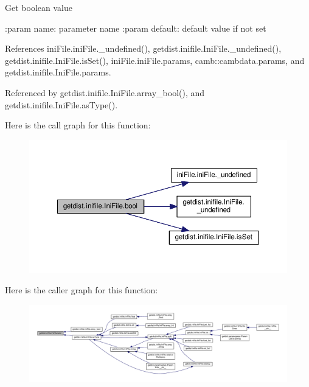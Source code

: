 \begin{DoxyVerb}Get boolean value

:param name: parameter name
:param default: default value if not set
\end{DoxyVerb}
 

References ini\+File.\+ini\+File.\+\_\+undefined(), getdist.\+inifile.\+Ini\+File.\+\_\+undefined(), getdist.\+inifile.\+Ini\+File.\+is\+Set(), ini\+File.\+ini\+File.\+params, camb\+::cambdata.\+params, and getdist.\+inifile.\+Ini\+File.\+params.



Referenced by getdist.\+inifile.\+Ini\+File.\+array\+\_\+bool(), and getdist.\+inifile.\+Ini\+File.\+as\+Type().

Here is the call graph for this function\+:
\nopagebreak
\begin{figure}[H]
\begin{center}
\leavevmode
\includegraphics[width=350pt]{classgetdist_1_1inifile_1_1IniFile_a6f6192fc30f45202f5675ecd70856010_cgraph}
\end{center}
\end{figure}
Here is the caller graph for this function\+:
\nopagebreak
\begin{figure}[H]
\begin{center}
\leavevmode
\includegraphics[width=350pt]{classgetdist_1_1inifile_1_1IniFile_a6f6192fc30f45202f5675ecd70856010_icgraph}
\end{center}
\end{figure}
\mbox{\label{classgetdist_1_1inifile_1_1IniFile_a3e462a0dea71c6a61530a420c38b597b}} 
